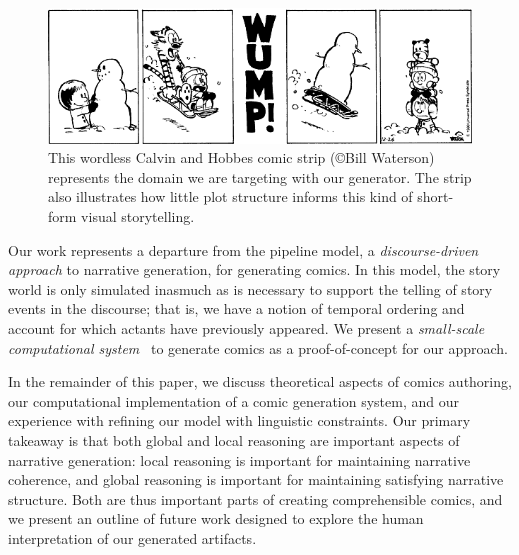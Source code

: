 \begin{figure}
\includegraphics[width=\columnwidth]{calvin-and-hobbes.png}
\caption{
This wordless Calvin and Hobbes comic strip (\copyright Bill Waterson)
represents the domain we are targeting with our generator. The strip also
illustrates how little plot structure informs this kind of short-form visual
storytelling.
}
\label{fig:calvin}
\end{figure}


Our work represents a departure from the pipeline model, a
\emph{discourse-driven approach} to narrative generation, for generating
comics. In this model, the story world is only simulated inasmuch as is
necessary to support the telling of story events in the discourse; that is,
we have a notion of temporal ordering and account for which actants have
previously appeared. We present a \emph{small-scale computational
system}~\cite{montfort2012small} to generate comics as a proof-of-concept
for our approach.

In the remainder of this paper, we discuss theoretical aspects of comics
authoring, our computational implementation of a comic generation system,
and our experience with refining our model with linguistic constraints. Our
primary takeaway is that both global and local reasoning are important
aspects of narrative generation: local reasoning is important for
maintaining narrative coherence, and global reasoning is important for
maintaining satisfying narrative structure. Both are thus important parts
of creating comprehensible comics, and we present an outline of future work
designed to explore the human interpretation of our generated artifacts.

